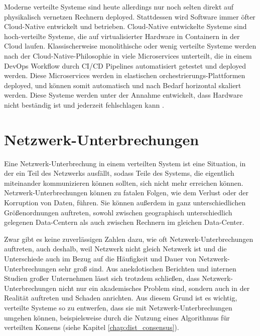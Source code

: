 \documentclass[12pt,a4paper]{report}
\begin{document}
Moderne verteilte Systeme sind heute allerdings nur noch selten direkt auf physikalisch vernetzen Rechnern deployed. Stattdessen
wird Software immer öfter Cloud-Native entwickelt und betrieben. Cloud-Native entwickelte Systeme sind hoch-verteilte Systeme, die
auf virtualisierter Hardware in Containern in der Cloud laufen. Klassischerweise monolithische oder wenig verteilte Systeme
werden nach der Cloud-Native-Philosophie in viele Microservices unterteilt, die in einem DevOps Workflow durch CI/CD Pipelines
automatisiert getestet und deployed werden. Diese Microservices werden in elastischen orchestrierungs-Plattformen deployed, und
können somit automatisch und nach Bedarf horizontal skaliert werden. \cite{cloud_native_10_years} Diese Systeme werden unter der
Annahme entwickelt, dass Hardware nicht beständig ist und jederzeit fehlschlagen kann \cite{cloud_native_applications}.

\section{Netzwerk-Unterbrechungen}
Eine Netzwerk-Unterbrechung in einem verteilten System ist eine Situation, in der ein Teil des Netzwerks ausfällt, sodass Teile
des Systems, die eigentlich miteinander kommunizieren können sollten, sich nicht mehr erreichen können. Netzwerk-Unterbrechungen
können zu fatalen Folgen, wie dem Verlust oder der Korruption von Daten, führen. Sie können außerdem in ganz unterschiedlichen
Größenordnungen auftreten, sowohl zwischen geographisch unterschiedlich gelegenen Data-Centern als auch zwischen Rechnern im
gleichen Data-Center. \cite{analysis_of_network_partition_failures}

Zwar gibt es keine zuverlässigen Zahlen dazu, wie oft Netzwerk-Unterbrech\-un\-gen auftreten, auch deshalb, weil Netzwerk nicht gleich
Netzwerk ist und die Unterschiede auch im Bezug auf die Häufigkeit und Dauer von Netzwerk-Unterbrechungen sehr groß sind. Aus
anekdotischen Berichten und internen Studien großer Unternehmen lässt sich trotzdem schließen, dass Netzwerk-Unterbrechungen nicht
nur ein akademisches Problem sind, sondern auch in der Realität auftreten und Schaden anrichten. Aus diesem Grund ist es wichtig,
verteilte Systeme so zu entwerfen, dass sie mit Netzwerk-Unterbrechungen umgehen können, beispielsweise durch die Nutzung eines
Algorithmus für verteilten Konsens (siehe Kapitel \ref{chap:dist_consensus}). \cite{the_network_is_reliable}
\end{document}
